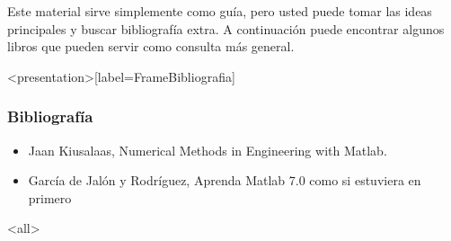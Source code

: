 Este material sirve simplemente como guía, pero usted puede tomar las ideas principales
y buscar bibliografía extra. A continuación puede encontrar algunos libros que pueden
servir como consulta más general.

\begin{figure}
\end{figure}

\mode*
\begin{frame}<presentation>[label=FrameBibliografia]
  \frametitle{Bibliografía}

  \begin{itemize}

    \item Jaan Kiusalaas, Numerical Methods in Engineering with Matlab.

    \item García de Jalón y Rodríguez, Aprenda Matlab 7.0 como si estuviera en primero

  \end{itemize}

\end{frame}

\mode<all>
